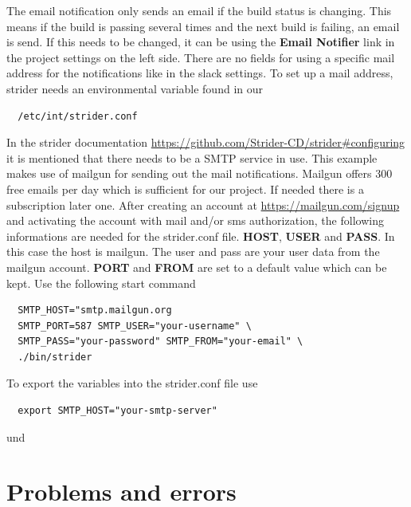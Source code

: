 The email notification only sends an email if the build status is changing. This means if the build is passing several times and the next
build is failing, an email is send. If this needs to be changed, it can be using the \textbf{Email Notifier} link in the project settings on the left side.
There are no fields for using a specific mail address for the notifications like in the slack settings. To set up a mail address, strider needs an environmental
variable found in our

\begin{lstlisting}
  /etc/int/strider.conf
\end{lstlisting}

In the strider documentation \url{https://github.com/Strider-CD/strider#configuring} it is mentioned that there needs to be a SMTP service in use. This
example makes use of mailgun for sending out the mail notifications. Mailgun offers 300 free emails per day which is sufficient for our project. If needed
there is a subscription later one. After creating an account at \url{https://mailgun.com/signup} and activating the account with mail and/or sms authorization,
the following informations are needed for the strider.conf file. \textbf{HOST}, \textbf{USER} and \textbf{PASS}. In this case the host is mailgun. The user
and pass are your user data from the mailgun account. \textbf{PORT} and \textbf{FROM} are set to a default value which can be kept.
Use the following start command

\begin{lstlisting}
  SMTP_HOST="smtp.mailgun.org
  SMTP_PORT=587 SMTP_USER="your-username" \
  SMTP_PASS="your-password" SMTP_FROM="your-email" \
  ./bin/strider
\end{lstlisting}

To export the variables into the strider.conf file use

\begin{lstlisting}
  export SMTP_HOST="your-smtp-server"
\end{lstlisting}

\cite{strider} und
\cite{stridergithub}

\section{Problems and errors}
\label{section:Problems and errors}

